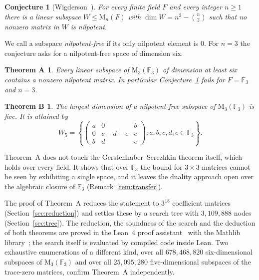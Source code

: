 \documentclass[screen]{aomart}
\newtheorem{conjecture}[theorem]{Conjecture}
\newtheorem*{theoremA}{Theorem A}
\newtheorem*{theoremB}{Theorem B}
\theoremstyle{definition}
\theoremstyle{remark}
\numberwithin{equation}{section}
\newcommand{\F}{\mathbb{F}}
\newcommand{\M}{\mathrm{M}}
\begin{document}
\begin{conjecture}[{Wigderson~\cite[Conjecture~8]{Wi}}]\label{conj:W}
For every finite field $F$ and every integer $n\ge1$ there is a linear subspace $W\le\M_n(F)$ with $\dim W=n^2-\binom n2$ such that no nonzero matrix in $W$ is nilpotent.
\end{conjecture}

We call a subspace \emph{nilpotent-free} if its only nilpotent element is $0$. For $n=3$ the conjecture asks for a nilpotent-free space of dimension six.

\begin{theoremA}
Every linear subspace of $\M_3(\F_3)$ of dimension at least six contains a nonzero nilpotent matrix. In particular Conjecture~\ref{conj:W} fails for $F=\F_3$ and $n=3$.
\end{theoremA}

\begin{theoremB}
The largest dimension of a nilpotent-free subspace of $\M_3(\F_3)$ is five. It is attained by
\begin{equation}\label{eq:W5}
W_5=\left\{\begin{pmatrix} a&0&b\\ 0&c-d-e&c\\ b&d&e\end{pmatrix} : a,b,c,d,e\in\F_3\right\}.
\end{equation}
\end{theoremB}

Theorem~A does not touch the Gersten\-haber--\hspace{0pt}Serezhkin theorem itself, which holds over every field. It shows that over $\F_3$ the bound for $3\times3$ matrices cannot be seen by exhibiting a single space, and it leaves the duality approach open over the algebraic closure of $\F_3$ (Remark~\ref{rem:transfer}).

The proof of Theorem~A reduces the statement to $3^{18}$ coefficient matrices (Section~\ref{sec:reduction}) and settles these by a search tree with $3{,}109{,}888$ nodes (Section~\ref{sec:tree}). The reduction, the soundness of the search and the deduction of both theorems are proved in the Lean~4 proof assistant~\cite{MU} with the Mathlib library~\cite{Mathlib}; the search itself is evaluated by compiled code inside Lean. Two exhaustive enumerations of a different kind, over all $678{,}468{,}820$ six-dimensional subspaces of $\M_3(\F_3)$ and over all $25{,}095{,}280$ five-dimensional subspaces of the trace-zero matrices, confirm Theorem~A independently.
\end{document}
